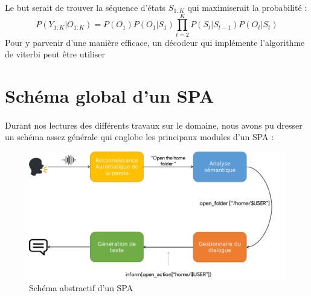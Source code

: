 	\par
	\newpage
	Le but serait de trouver la séquence d'états $S_{1:K}$ qui maximiserait la probabilité \cite{hmm_intro} : 
	\begin{equation}
		P(Y_{1:K} | O_{1:K}) = P(O_1)P(O_1|S_1)\prod_{t=2}^{K}P(S_t|S_{t-1})P(O_t|S_t) 
	\end{equation}
	Pour y parvenir d'une manière efficace, un décodeur qui implémente l'algorithme de viterbi peut être utiliser \cite{viterbi,viterbi_hmm}
\section{Schéma global d'un SPA}
	\label{spa_schem_section}
	\paragraph{}
	Durant nos lectures des différents travaux sur le domaine, nous avons pu dresser un schéma assez générale qui englobe les principaux modules d'un SPA : 
	\begin{figure}[H]
		\centering
		\includegraphics[width=0.75\linewidth]{images/SPA_diagram_2.png}
		\caption{Schéma abstractif d'un SPA \cite{spa_arch}}
		\label{spa_diagram}
	\end{figure}
